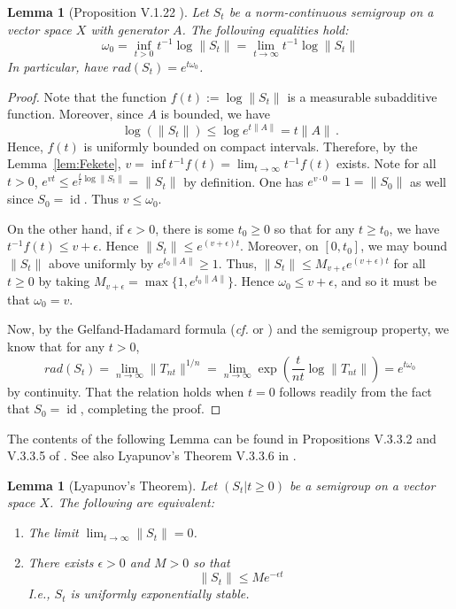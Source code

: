 \documentclass{article}
\DeclareMathOperator{\id}{id}
\newcommand{\<}{\langle}
\renewcommand{\>}{\rangle}
\numberwithin{equation}{section}
\newtheorem{lem}[thm]{Lemma}
\theoremstyle{definition}
\begin{document}
\begin{lem}[Proposition V.1.22 \cite{EngelNagel_Short}]\label{lem:appendix_growth_bound}
	Let $S_t$ be a norm-continuous semigroup on a vector space $X$ with generator $A$. The following equalities hold:
	\begin{equation}
		\omega_0 = \inf_{t>0} t^{-1} \log \|S_t\| = \lim_{t\to \infty} t^{-1} \log \|S_t\|
	\end{equation} In particular, have $rad(S_t) = e^{t \omega_0}$. 
\end{lem}
\begin{proof}
	Note that the function $f(t) := \log \|S_t\|$ is a measurable subadditive function. Moreover, since $A$ is bounded, we have 
	\begin{equation}
		\log(\|S_t\|) \le \log e^{t\|A\|} = t\|A\|\,.
	\end{equation} Hence, $f(t)$ is uniformly bounded on compact intervals. Therefore, by the Lemma~\ref{lem:Fekete}, $v = \inf t^{-1}f(t) = \lim_{t\to \infty} t^{-1}f(t)$ exists. Note for all $t>0$, $e^{vt} \le e^{\frac{t}{t} \log \|S_t\|}= \|S_t\|$ by definition. One has $e^{v\cdot 0} = 1 = \|S_0\|$ as well since $S_0 = \id$. Thus $v\le \omega_0$. 
	
	On the other hand, if $\epsilon >0$, there is some $t_0\ge 0$ so that for any $t\ge t_0$, we have $t^{-1}f(t) \le v+\epsilon$. Hence $\|S_t\| \le e^{(v+\epsilon) t}$. Moreover, on $[0,t_0]$, we may bound $\|S_t\|$ above uniformly by $e^{t_0 \|A\|}\ge 1$. Thus, $\|S_t \| \le M_{v+\epsilon} e^{(v+\epsilon)t}$ for all $t\ge 0$ by taking $M_{v+\epsilon} = \max\{1, e^{t_0 \|A\|}\}$. Hence $\omega_0\le v+\epsilon$, and so it must be that $\omega_0 = v$. 
	
	Now, by the Gelfand-Hadamard formula (\textit{cf.} \cite{Bhatia} or \cite{Weidmann}) and the semigroup property, we know that for any $t>0$, 
		\begin{equation}
			rad(S_t) = \lim_{n\to \infty} \|T_{nt}\|^{1/n} = \lim_{n\to \infty} \exp \left( \frac{t}{nt} \log \|T_{nt}\| \right)= e^{t\omega_0}
		\end{equation} by continuity. That the relation holds when $t=0$ follows readily from the fact that $S_0 = \id$, completing the proof.
		\end{proof}
The contents of the following Lemma can be found in Propositions V.3.3.2 and V.3.3.5 of \cite{EngelNagel_Short}. See also Lyapunov's Theorem V.3.3.6 in \cite{EngelNagel_Short}.
\begin{lem}[Lyapunov's Theorem]
Let $(S_t|t\ge 0)$ be a semigroup on a vector space $X$. The following are equivalent: 
	\begin{enumerate}
		\item The limit $\lim_{t\to \infty} \|S_t\| = 0$. 
		\item There exists $\epsilon >0$ and $M>0$ so that 
			\begin{equation}
				\|S_t\| \le Me^{-\epsilon t}
			\end{equation} \textit{I.e.}, $S_t$ is \textit{uniformly exponentially stable}.
	\end{enumerate}
\end{lem}
\end{document}
